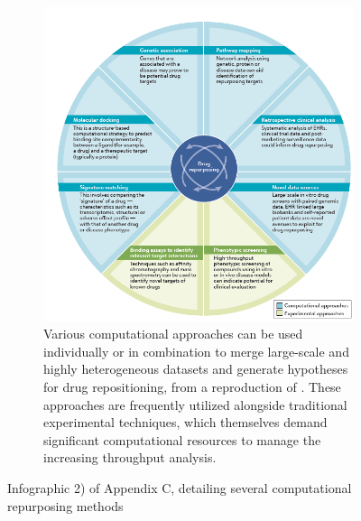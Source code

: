 \begin{figure}
\begin{subfigure}[b]{0.4\textwidth}
         \label{subfig:icell-extended}
     \end{subfigure}  
     \hfill
     \begin{subfigure}[b]{0.4\textwidth}
         \centering
         \includegraphics[width=\textwidth]{figures/repurposing/repositioning_strategies_general.png}
         \caption[\textbf{Drug repurposing strategies}]{Various computational approaches can be used individually or in combination to merge large-scale and highly heterogeneous datasets and generate hypotheses for drug repositioning, from a reproduction of \autocite[Fig. 1]{pushpakom_etal19}. These approaches are frequently utilized alongside traditional experimental techniques, which themselves demand significant computational resources to manage the increasing throughput analysis.}
         \label{subfig:repositioning-strategies-general}
     \end{subfigure}  
    \caption{Infographic 2) of Appendix C, detailing several computational repurposing methods}
    \label{fig:infographic-repurposing}
\end{figure}






